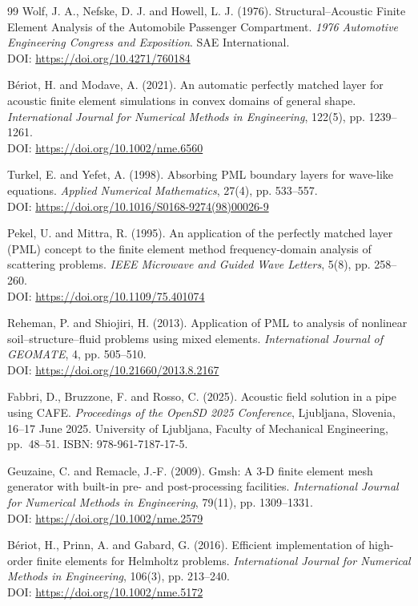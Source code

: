 \documentclass{jors}
\begin{document}
\begin{thebibliography}{99}
Wolf, J. A., Nefske, D. J. and Howell, L. J. (1976).
Structural--Acoustic Finite Element Analysis of the Automobile Passenger Compartment.
\textit{1976 Automotive Engineering Congress and Exposition}.
SAE International.\\
DOI: \url{https://doi.org/10.4271/760184}

B\'{e}riot, H. and Modave, A. (2021).
An automatic perfectly matched layer for acoustic finite element simulations in convex domains of general shape.
\textit{International Journal for Numerical Methods in Engineering}, 122(5), pp. 1239--1261.\\
DOI: \url{https://doi.org/10.1002/nme.6560}

Turkel, E. and Yefet, A. (1998).
Absorbing PML boundary layers for wave-like equations.
\textit{Applied Numerical Mathematics}, 27(4), pp. 533--557.\\
DOI: \url{https://doi.org/10.1016/S0168-9274(98)00026-9}

Pekel, U. and Mittra, R. (1995).
An application of the perfectly matched layer (PML) concept to the finite element method frequency-domain analysis of scattering problems.
\textit{IEEE Microwave and Guided Wave Letters}, 5(8), pp. 258--260.\\
DOI: \url{https://doi.org/10.1109/75.401074}

Reheman, P. and Shiojiri, H. (2013).
Application of PML to analysis of nonlinear soil--structure--fluid problems using mixed elements.
\textit{International Journal of GEOMATE}, 4, pp. 505--510.\\
DOI: \url{https://doi.org/10.21660/2013.8.2167}

Fabbri, D., Bruzzone, F. and Rosso, C. (2025).
Acoustic field solution in a pipe using CAFE.
\textit{Proceedings of the OpenSD 2025 Conference}, Ljubljana, Slovenia, 16--17 June 2025.
University of Ljubljana, Faculty of Mechanical Engineering, pp.~48--51.
ISBN: 978-961-7187-17-5.

Geuzaine, C. and Remacle, J.-F. (2009).
Gmsh: A 3-D finite element mesh generator with built-in pre- and post-processing facilities.
\textit{International Journal for Numerical Methods in Engineering}, 79(11), pp. 1309--1331.\\
DOI: \url{https://doi.org/10.1002/nme.2579}

B\'{e}riot, H., Prinn, A. and Gabard, G. (2016).
Efficient implementation of high-order finite elements for Helmholtz problems.
\textit{International Journal for Numerical Methods in Engineering}, 106(3), pp. 213--240.\\
DOI: \url{https://doi.org/10.1002/nme.5172}


\end{thebibliography}
\end{document}
